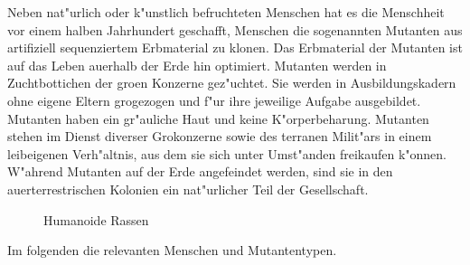 
Neben nat"urlich oder k"unstlich befruchteten Menschen hat es die Menschheit vor einem halben Jahrhundert geschafft, Menschen die sogenannten Mutanten aus artifiziell sequenziertem Erbmaterial zu klonen. Das Erbmaterial der Mutanten ist auf das Leben au\3erhalb der Erde hin optimiert. Mutanten werden in Zuchtbottichen der gro\3en Konzerne gez"uchtet. Sie werden in Ausbildungskadern ohne eigene Eltern gro\3gezogen und f"ur ihre jeweilige Aufgabe ausgebildet. Mutanten haben ein gr"auliche Haut und keine K"orperbeharung. Mutanten stehen im Dienst diverser Gro\3konzerne sowie des terranen Milit"ars in einem leibeigenen Verh"altnis, aus dem sie sich unter Umst"anden freikaufen k"onnen. W"ahrend Mutanten auf der Erde angefeindet werden, sind sie in den au\3erterrestrischen Kolonien ein nat"urlicher Teil der Gesellschaft.

\begin{figure}[htbp]
      \centering
      \newline{}Humanoide Rassen
      \label{fig:humanoide-rassen}
\end{figure}
    

Im folgenden die relevanten Menschen und Mutantentypen.

